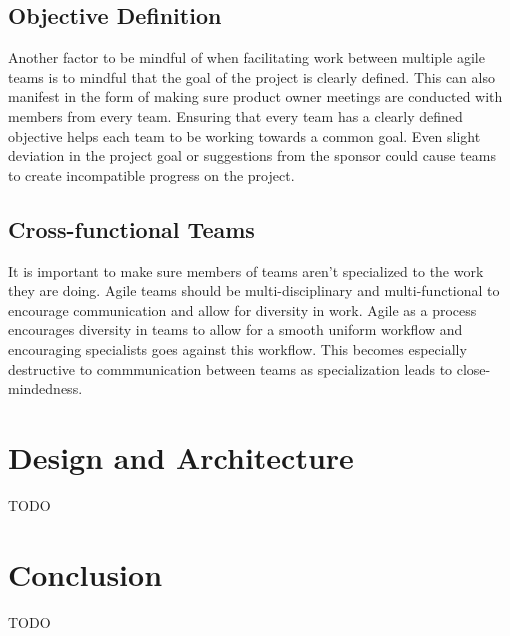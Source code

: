 \documentclass[sigplan,screen]{acmart}
\begin{document}
\subsection{Objective Definition}
Another factor to be mindful of when facilitating work between multiple agile teams is to mindful that the goal of the project is clearly defined. This can also manifest in the form of making sure product owner meetings are conducted  with members from every team. Ensuring that every team has a clearly defined objective helps each team to be working towards a common goal. Even slight deviation in the project goal or suggestions from the sponsor could cause teams to create incompatible progress on the project.

\subsection{Cross-functional Teams}
It is important to make sure members of teams aren't specialized to the work they are doing. Agile teams should be multi-disciplinary and multi-functional to encourage communication and allow for diversity in work. Agile as a process encourages diversity in teams to allow for a smooth uniform workflow and encouraging specialists goes against this workflow. This becomes especially destructive to commmunication between teams as specialization leads to close-mindedness.

\section{Design and Architecture}
TODO

\section{Conclusion}
TODO



\end{document}
